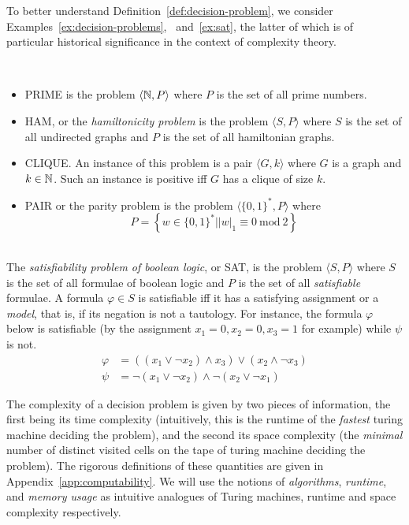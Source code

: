 To better understand Definition~\ref{def:decision-problem}, we consider Examples~\ref{ex:decision-problems},
~and~\ref{ex:sat}, the latter of which is of particular historical significance in the context of complexity theory.
\begin{example}\ \\
    \label{ex:decision-problems}
    \begin{itemize}
        \item \textsf{PRIME} is the problem \(\langle \mathbb{N}, P\rangle\) where \(P\) is the set of all prime numbers. 
        \item \textsf{HAM}, or the \emph{hamiltonicity problem} is the problem \(\langle S, P \rangle\) where \(S\) is the set of all undirected graphs and \(P\) is the set of all hamiltonian graphs.
        \item \textsf{CLIQUE}. An instance of this problem is a pair \(\langle G, k\rangle\) where \(G\) is a graph and \(k\in\mathbb{N}\). Such an instance is positive iff \(G\) has a clique of size \(k\). 
        \item \textsf{PAIR} or the parity problem is the problem \(\langle \{0, 1\}^\ast, P \rangle\) where 
        \[P = \left\{w\in \{0, 1\}^\ast\big| |w|_1 \equiv 0 \mathrm{\ mod\ } 2 \right\}\]
    \end{itemize}
\end{example}

\begin{example}\ \\
    \label{ex:sat}
    The \emph{satisfiability problem of boolean logic}, or \textsf{SAT}, is the problem \(\langle S, P\rangle\) where \(S\) is the set of all formulae of boolean logic and \(P\) is the set of all \emph{satisfiable} formulae. A formula \(\varphi \in S\) is satisfiable iff it has a satisfying assignment or a \emph{model}, that is, if its negation is not a tautology. For instance, the formula \(\varphi\) below is satisfiable (by the assignment \(x_1 = 0, x_2 = 0, x_3 = 1\) for example) while \(\psi\) is not.
    \begin{align*}
        \varphi& = \left((x_1 \vee \neg x_2) \wedge x_3\right) \vee (x_2 \wedge \neg x_3)\\
        \psi &= \neg (x_1 \vee \neg x_2) \wedge \neg (x_2 \vee \neg x_1)
    \end{align*}
\end{example}

The complexity of a decision problem is given by two pieces of information, the first being its time complexity (intuitively, this is the runtime of the \emph{fastest} turing machine deciding the problem), and the second its space complexity (the \emph{minimal} number of distinct visited cells on the tape of turing machine deciding the problem). The rigorous definitions of these quantities are given in Appendix~\ref{app:computability}. We will use the notions of \emph{algorithms}, \emph{runtime}, and \emph{memory usage} as intuitive analogues of Turing machines, runtime and space complexity respectively.

